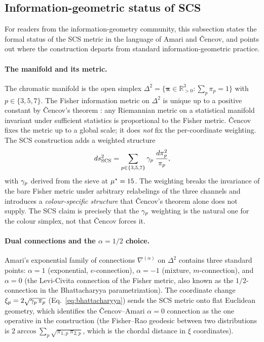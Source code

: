 \documentclass[12pt,a4paper]{article}
\begin{document}
\subsection{Information-geometric status of SCS}
\label{sec:infogeo}

For readers from the information-geometry community, this subsection
states the formal status of the SCS metric in the language of Amari
and \v{C}encov, and points out where the construction departs from
standard information-geometric practice.

\paragraph{The manifold and its metric.}
The chromatic manifold is the open simplex
$\Delta^2 = \{\bm{\pi} \in \mathbb{R}^3_{>0} : \sum_p \pi_p = 1\}$
with $p \in \{3, 5, 7\}$. The Fisher information metric on
$\Delta^2$ is unique up to a positive constant by \v{C}encov's theorem
\cite{cencov1982}: any Riemannian metric on a statistical manifold
invariant under sufficient statistics is proportional to the Fisher
metric. \v{C}encov fixes the metric up to a global scale; it does
\emph{not} fix the per-coordinate weighting. The SCS construction
adds a weighted structure
\begin{equation}
  ds^2_{\mathrm{SCS}}
  = \sum_{p \in \{3,5,7\}} \gamma_{p}\;\frac{d\pi_p^2}{\pi_p},
  \label{eq:scs_metric}
\end{equation}
with $\gamma_{p}$ derived from the sieve at ${\mu^{*}} = 15$. The
weighting breaks the invariance of the bare Fisher metric under
arbitrary relabelings of the three channels and introduces a
\emph{colour-specific structure} that \v{C}encov's theorem alone does
not supply. The SCS claim is precisely that the $\gamma_{p}$ weighting
is the natural one for the colour simplex, not that \v{C}encov forces
it.

\paragraph{Dual connections and the $\alpha = 1/2$ choice.}
Amari's exponential family of connections $\nabla^{(\alpha)}$ on
$\Delta^2$ contains three standard points: $\alpha = 1$ (exponential,
$e$-connection), $\alpha = -1$ (mixture, $m$-connection), and
$\alpha = 0$ (the Levi-Civita connection of the Fisher metric, also
known as the $1/2$-connection in the Bhattacharyya parametrization).
The coordinate change $\xi_p = 2\sqrt{\gamma_{p}\,\pi_p}$
(Eq.~\eqref{eq:bhattacharyya}) sends the SCS metric onto flat
Euclidean geometry, which identifies the \v{C}encov--Amari
$\alpha = 0$ connection as the one operative in the construction
(the Fisher--Rao geodesic between two distributions is
$2 \arccos \sum_p \sqrt{\pi_{1,p}\,\pi_{2,p}}$, which is the chordal
distance in $\xi$ coordinates).
\end{document}
